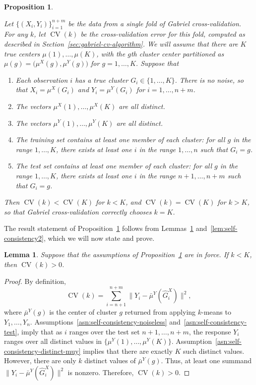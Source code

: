 \documentclass[12pt]{article}
\newtheorem{lemma}{Lemma}
\newtheorem{proposition}{Proposition}
\newcommand{\CV}{\operatorname{CV}}
\newcommand{\muX}{\mu^{X}}
\newcommand{\muY}{\mu^{Y}}
\newcommand{\bmuY}{\bar \mu^{Y}}
\newcommand{\hGX}{\hat G^{X}}
\begin{document}
\begin{proposition}\label{prop:self-consistency}

Let $\{ (X_i, Y_i) \}_{i=1}^{n+m}$ be the data from a single fold of Gabriel
cross-validation.  For any $k$, let $\CV(k)$ be the cross-validation error for
this fold, computed as described in Section~\ref{sec:gabriel-cv-algorithm}.
We will assume that there are $K$ true centers $\mu(1), \dotsc,\mu(K)$, with
the $g$th cluster center partitioned as $\mu(g) = \bigl(\muX(g),
\muY(g)\bigr)$ for $g = 1, \dotsc, K$.  Suppose that
\begin{enumerate}[label=(\roman*)]
  \item \label{asn:self-consistency-noiseless}
    Each observation $i$ has a true cluster $G_i \in \{ 1, \dotsc, K \}$.
    There is no noise, so that $X_i = \muX({G_i})$ and $Y_i = \muY(G_i)$ for
    $i = 1, \dotsc, n+m$.
  \item \label{asn:self-consistency-distinct-mux}
    The vectors $\muX(1), \dotsc,\muX(K)$ are all distinct.
  \item \label{asn:self-consistency-distinct-muy}
    The vectors $\muY(1), \dotsc,\muY(K)$ are all distinct.
  \item \label{asn:self-consistency-train}
    The training set contains at least one member of each cluster: for all $g$
    in the range $1, \dotsc, K$, there exists at least one $i$ in the range
    $1, \dotsc, n$ such that $G_i = g$.
  \item \label{asn:self-consistency-test}
    The test set contains at least one member of each cluster: for all $g$ in
    the range $1, \dotsc, K$, there exists at least one $i$ in the range $n+1,
    \dotsc, n+m$ such that $G_i = g$.
\end{enumerate}
Then $\CV(k) < \CV(K)$ for $k < K$, and $\CV(k) = \CV(K)$ for $k > K$, so that
Gabriel cross-validation correctly chooses $k = K$.
\end{proposition}

The result statement of Proposition~\ref{prop:self-consistency} follows from 
Lemmas~\ref{lem:self-consistency1} and~\ref{lem:self-consistency2}, which we
will now state and prove.

\begin{lemma}\label{lem:self-consistency1}
Suppose that the assumptions of Proposition~\ref{prop:self-consistency} are in
force.  If $k < K$, then $\CV(k) > 0$.
\end{lemma}
\begin{proof}
By definition,
\[
  \CV(k)
    =
      \sum_{i=n+1}^{n+m}
        \| Y_i - \bmuY (\hGX_i) \|^2,
\]
where $\bmuY(g)$ is the center of cluster $g$ returned from applying $k$-means
to $Y_1, \dotsc, Y_n$.  Assumptions~\ref{asn:self-consistency-noiseless}
and~\ref{asn:self-consistency-test}, imply that as $i$ ranges over the test
set $n+1, \dotsc, n+m$, the response $Y_i$ ranges over all distinct values in
$\{ \muY(1), \dotsc, \muY(K) \}$.
Assumption~\ref{asn:self-consistency-distinct-muy} implies that there are
exactly $K$ such distinct values.  However, there are only $k$ distinct values
of $\bmuY(g)$.  Thus, at least one summand
\(
  \| Y_i - \bmuY(\hGX_i) \|^2
\)
is nonzero.  Therefore,
\(
  \CV(k) > 0.
\)
\end{proof}
\end{document}
